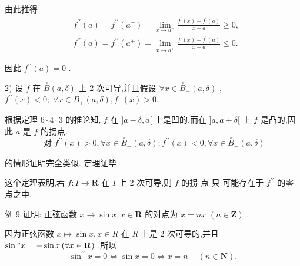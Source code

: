 由此推得
\begin{align*}
	&{f}^{\prime \prime }\left( a\right)  = {f}^{\prime \prime }\left( {a}^{ - }\right)  = \mathop{\lim }\limits_{{x \rightarrow  {a}^{ - }}}\frac{{f}^{\prime }\left( x\right)  - {f}^{\prime }\left( a\right) }{x - a} \geq  0,\\
	&{f}^{\prime \prime }\left( a\right)  = {f}^{\prime \prime }\left( {a}^{ + }\right)  = \mathop{\lim }\limits_{{x \rightarrow  {a}^{ + }}}\frac{{f}^{\prime }\left( x\right)  - {f}^{\prime }\left( a\right) }{x - a} \leq  0.
\end{align*}

因此 ${f}^{\prime \prime }\left( a\right)  = 0$ .

2) 设 $f$ 在 $\overset{ \circ  }{B}\left( {a,\delta }\right)$ 上 2 次可导,并且假设 $\forall x \in  {\overset{ \circ  }{B}}_{ - }\left( {a,\delta }\right)$ , ${f}^{\prime \prime }\left( x\right)  < 0;\;\forall x \in  {B}_{ + }\left( {a,\delta }\right) ,{f}^{\prime \prime }\left( x\right)  > 0.$

根据定理 $6 \cdot  4 \cdot  3$ 的推论知, $f$ 在 $\rbrack a - \delta ,a\lbrack$ 上是凹的,而在 $\rbrack a,a + \delta \lbrack$ 上 $f$ 是凸的,因此 $a$ 是 $f$ 的拐点.
$$\text{ 对 }{f}^{\prime \prime }\left( x\right)  > 0,\forall x \in  {\overset{ \circ  }{B}}_{ - }\left( {a,\delta }\right) ;{f}^{\prime \prime }\left( x\right)  < 0,\forall x \in  {\overset{ \circ  }{B}}_{ + }\left( {a,\delta }\right)$$

的情形证明完全类似. 定理证毕.

这个定理表明,若 $f : I \rightarrow  \mathbf{R}$ 在 $I$ 上 2 次可导,则 $f$ 的拐 点 只 可能存在于 ${f}^{\prime \prime }$ 的零点之中.

例 9 证明: 正弦函数 $x \rightarrow  \sin x,x \in  \mathbf{R}$ 的对点为 $x = {nx}$  $\left( {n \in  \mathbf{Z}}\right)$ .

因为正弦函数 $x \mapsto  \sin x,x \in  R$ 在 $R$ 上是 2 次可导的,并且 $\sin {"x} =  - \sin x\left( {\forall x \in  \mathbf{R}}\right)$ ,所以
$${\sin }^{\prime \prime }x = 0 \Leftrightarrow  \sin x = 0 \Leftrightarrow  x = n - \left( {n \in  \mathbf{N}}\right) .$$

